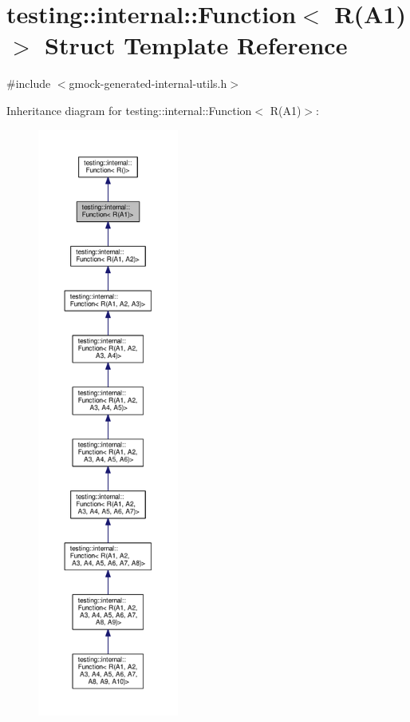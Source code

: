 \hypertarget{structtesting_1_1internal_1_1Function_3_01R_07A1_08_4}{}\section{testing\+:\+:internal\+:\+:Function$<$ R(A1)$>$ Struct Template Reference}
\label{structtesting_1_1internal_1_1Function_3_01R_07A1_08_4}


{\ttfamily \#include $<$gmock-\/generated-\/internal-\/utils.\+h$>$}



Inheritance diagram for testing\+:\+:internal\+:\+:Function$<$ R(A1)$>$\+:
\nopagebreak
\begin{figure}[H]
\begin{center}
\leavevmode
\includegraphics[height=550pt]{structtesting_1_1internal_1_1Function_3_01R_07A1_08_4__inherit__graph}
\end{center}
\end{figure}


